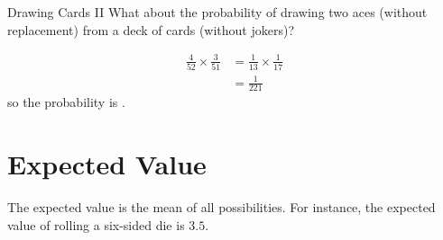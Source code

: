 \documentclass[a4paper,10pt]{report}
\begin{document}
\begin{problem}{Drawing Cards II}
 What about the probability of drawing two aces (without replacement) from a
 deck of cards (without jokers)?

 \begin{solution}
  \begin{align*}
   \frac{4}{52} \times \frac{3}{51}
   &= \frac{1}{13} \times \frac{1}{17} \\
   &= \frac{1}{221}
  \end{align*}
  so the probability is .
 \end{solution}
\end{problem}

\section{Expected Value}

The expected value is the mean of all possibilities. For instance, the expected
value of rolling a six-sided die is $3.5$.


\printglossaries

\cleardoublepage
{}
\listoffigures
\end{document}
